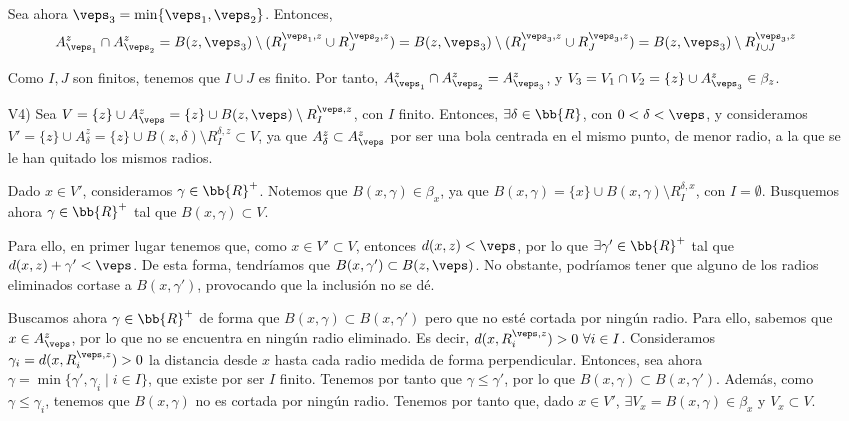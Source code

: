 \begin{ejercicio}
\begin{enumerate}
        Sea ahora $\veps_3=\min\{\veps_1, \veps_2\}$. Entonces,
        $$A_{\veps_1}^z\cap A_{\veps_2}^z
        =B(z,\veps_3)\setminus (R_I^{\veps_1, z}\cup R_J^{\veps_2, z})
        =B(z,\veps_3)\setminus (R_I^{\veps_3, z}\cup R_J^{\veps_3, z})
        =B(z,\veps_3)\setminus R_{I\cup J}^{\veps_3, z}$$

        Como $I,J$ son finitos, tenemos que $I\cup J$ es finito. Por tanto, $A_{\veps_1}^z\cap A_{\veps_2}^z=A_{\veps_3}^z$, y $V_3=V_1\cap V_2=\{z\}\cup A_{\veps_3}^z\in \beta_z$.

        \item[V4)] Sea $V=\{z\}\cup A_{\veps}^z=\{z\}\cup B(z,\veps)\setminus R_{I}^{\veps,z}$, con $I$ finito. Entonces, $\exists \delta\in \bb{R}$, con $0<\delta<\veps$, y consideramos $V'=\{z\}\cup A_{\delta}^z=\{z\}\cup B(z,\delta)\setminus R_I^{\delta,z}\subset V$, ya que $A_\delta^z\subset A_\veps^z$ por ser una bola centrada en el mismo punto, de menor radio, a la que se le han quitado los mismos radios.

        Dado $x\in V'$, consideramos $\gamma\in \bb{R}^+$. Notemos que $B(x,\gamma)\in \beta_x$, ya que $B(x,\gamma)=\{x\}\cup B(x,\gamma)\setminus R_I^{\delta,x}$, con $I=\emptyset$. Busquemos ahora $\gamma\in \bb{R}^+$ tal que $B(x,\gamma)\subset V$.

        Para ello, en primer lugar tenemos que, como $x\in V'\subset V$, entonces $d(x,z)<\veps$, por lo que $\exists \gamma'\in \bb{R}^+$ tal que $d(x,z)+\gamma'<\veps$. De esta forma, tendríamos que $B(x,\gamma')\subset B(z,\veps)$. No obstante, podríamos tener que alguno de los radios eliminados cortase a $B(x,\gamma')$, provocando que la inclusión no se dé.
        
        Buscamos ahora $\gamma\in \bb{R}^+$ de forma que $B(x,\gamma)\subset B(x,\gamma')$ pero que no esté cortada por ningún radio. Para ello, sabemos que $x\in A_{\veps}^z$, por lo que no se encuentra en ningún radio eliminado. Es decir, $d(x,R_i^{\veps,z})>0~\forall i\in I$. Consideramos $\gamma_i=d(x,R_i^{\veps,z})>0$ la distancia desde $x$ hasta cada radio medida de forma perpendicular. Entonces, sea ahora $\gamma=\min\{\gamma', \gamma_i\mid i\in I\}$, que existe por ser $I$ finito. Tenemos por tanto que $\gamma\leq\gamma'$, por lo que $B(x,\gamma)\subset B(x,\gamma')$. Además, como $\gamma\leq \gamma_i$, tenemos que $B(x,\gamma)$ no es cortada por ningún radio. 
        Tenemos por tanto que, dado $x\in V'$, $\exists V_x=B(x,\gamma)\in \beta_x$ y $V_x\subset V$.
    \end{enumerate}
\end{ejercicio}

